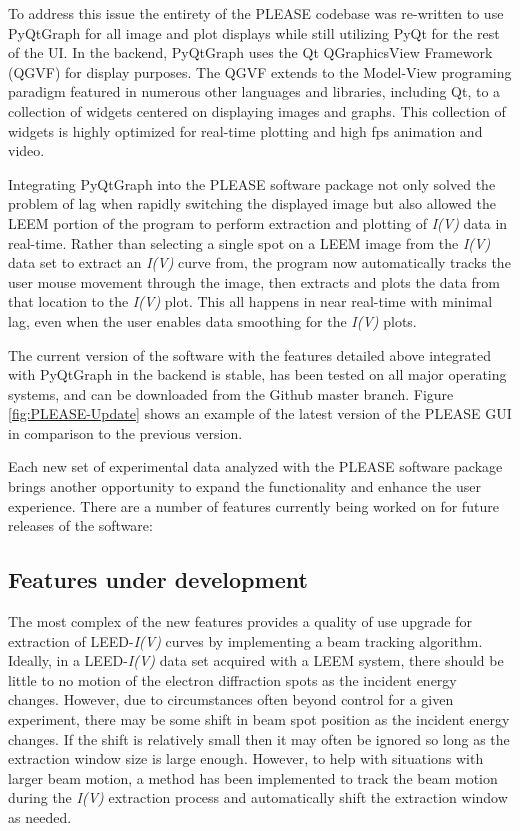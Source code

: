To address this issue the entirety of the PLEASE codebase was re-written to use PyQtGraph for all image and plot displays while still utilizing PyQt for the rest of the UI. In the backend, PyQtGraph uses the Qt QGraphicsView Framework (QGVF) for display purposes. The QGVF extends to the Model-View programing paradigm featured in numerous other languages and libraries, including Qt, to a collection of widgets centered on displaying images and graphs. This collection of widgets is highly optimized for real-time plotting and high fps animation and video.

Integrating PyQtGraph into the PLEASE software package not only solved the problem of lag when rapidly switching the displayed image but also allowed the LEEM portion of the program to perform extraction and plotting of \textit{I(V)} data in real-time. Rather than selecting a single spot on a LEEM image from the \textit{I(V)} data set to extract an \textit{I(V)} curve from, the program now automatically tracks the user mouse movement through the image, then extracts and plots the data from that location to the \textit{I(V)} plot. This all happens in near real-time with minimal lag, even when the user enables data smoothing for the \textit{I(V)} plots.

The current version of the software with the features detailed above integrated with PyQtGraph in the backend is stable, has been tested on all major operating systems, and can be downloaded from the Github master branch. Figure \ref{fig:PLEASE-Update} shows an example of the latest version of the PLEASE GUI in comparison to the previous version.

Each new set of experimental data analyzed with the PLEASE software package brings another opportunity to expand the functionality and enhance the user experience. There are a number of features currently being worked on for future releases of the software:

\subsection{Features under development}
The most complex of the new features provides a quality of use upgrade for extraction of LEED-\textit{I(V)} curves by implementing a beam tracking algorithm. Ideally, in a LEED-\textit{I(V)} data set acquired with a LEEM system, there should be little to no motion of the electron diffraction spots as the incident energy changes. However, due to circumstances often beyond control for a given experiment, there may be some shift in beam spot position as the incident energy changes. If the shift is relatively small then it may often be ignored so long as the extraction window size is large enough. However, to help with situations with larger beam motion, a method has been implemented to track the beam motion during the \textit{I(V)} extraction process and automatically shift the extraction window as needed.

